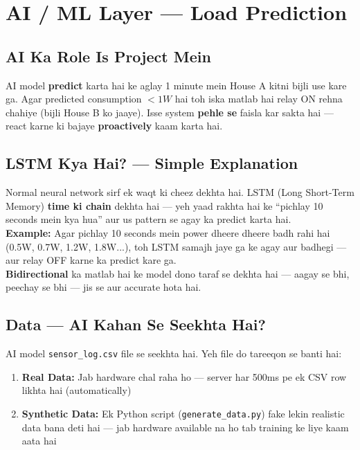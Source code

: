 \chapter{AI / ML Layer --- Load Prediction}

\section{AI Ka Role Is Project Mein}

\begin{conceptbox}
AI model \textbf{predict} karta hai ke aglay 1 minute mein House A kitni bijli use kare ga. Agar predicted consumption $< 1W$ hai toh iska matlab hai relay ON rehna chahiye (bijli House B ko jaaye). Isse system \textbf{pehle se} faisla kar sakta hai --- react karne ki bajaye \textbf{proactively} kaam karta hai.
\end{conceptbox}

\section{LSTM Kya Hai? --- Simple Explanation}

\begin{conceptbox}[LSTM = Memory Wala Neural Network]
Normal neural network sirf ek waqt ki cheez dekhta hai. LSTM (Long Short-Term Memory) \textbf{time ki chain} dekhta hai --- yeh yaad rakhta hai ke ``pichlay 10 seconds mein kya hua'' aur us pattern se agay ka predict karta hai.\\[0.3cm]
\textbf{Example:} Agar pichlay 10 seconds mein power dheere dheere badh rahi hai (0.5W, 0.7W, 1.2W, 1.8W...), toh LSTM samajh jaye ga ke agay aur badhegi --- aur relay OFF karne ka predict kare ga.\\[0.3cm]
\textbf{Bidirectional} ka matlab hai ke model dono taraf se dekhta hai --- aagay se bhi, peechay se bhi --- jis se aur accurate hota hai.
\end{conceptbox}

\section{Data --- AI Kahan Se Seekhta Hai?}

AI model \texttt{sensor\_log.csv} file se seekhta hai. Yeh file do tareeqon se banti hai:

\begin{enumerate}
    \item \textbf{Real Data:} Jab hardware chal raha ho --- server har 500ms pe ek CSV row likhta hai (automatically)
    \item \textbf{Synthetic Data:} Ek Python script (\texttt{generate\_data.py}) fake lekin realistic data bana deti hai --- jab hardware available na ho tab training ke liye kaam aata hai
\end{enumerate}

